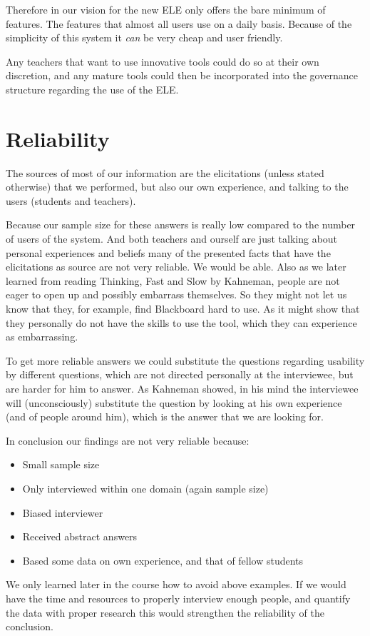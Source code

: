 Therefore in our vision for the new ELE only offers the bare minimum of features. The features that almost all users use on a daily basis. Because of the simplicity of this system it \emph{can} be very cheap and user friendly.

Any teachers that want to use innovative tools could do so at their own discretion, and any mature tools could then be incorporated into the governance structure regarding the use of the ELE.

\clearpage
\section{Reliability}
The sources of most of our information are the elicitations (unless stated otherwise) that we performed, but also our own experience, and talking to the users (students and teachers).

Because our sample size for these answers is really low compared to the number of users of the system. And both teachers and ourself are just talking about personal experiences and beliefs many of the presented facts that have the elicitations as source are not very reliable. We would be able.
Also as we later learned from reading Thinking, Fast and Slow by Kahneman, people are not eager to open up and possibly embarrass themselves. So they might not let us know that they, for example, find Blackboard hard to use. As it might show that they personally do not have the skills to use the tool, which they can experience as embarrassing.

To get more reliable answers we could substitute the questions regarding usability by different questions, which are not directed personally at the interviewee, but are harder for him to answer. As Kahneman showed, in his mind the interviewee will (unconsciously) substitute the question by looking at his own experience (and of people around him), which is the answer that we are looking for.

In conclusion our findings are not very reliable because:
\begin{itemize}
	\item Small sample size
	\item Only interviewed within one domain (again sample size)
	\item Biased interviewer
	\item Received abstract answers
	\item Based some data on own experience, and that of fellow students
\end{itemize}
We only learned later in the course how to avoid above examples. If we would have the time and resources to properly interview enough people, and quantify the data with proper research this would strengthen the reliability of the conclusion.

